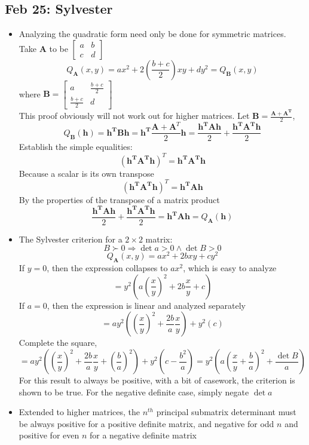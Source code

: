 \documentclass[10pt, oneside]{article}
\renewcommand{\vec}[1]{\mathbf{#1}}
\newcommand{\mat}[1]{\mathbf{#1}}
\begin{document}
\subsection{Feb 25: Sylvester}
\begin{itemize}
    \item Analyzing the quadratic form need only be done for symmetric matrices. Take $\mat{A}$ to be $\begin{bmatrix}
        a & b\\
        c & d
        \end{bmatrix}$
        \[Q_\mat{A} (x,y) = ax^2 + 2 \left( \frac{b+c}{2} \right) xy + dy^2 = Q_\mat{B}(x,y)\]
    where $\mat{B} = \begin{bmatrix}
        a & \frac{b+c}{2}\\
        \frac{b+c}{2} & d
    \end{bmatrix}$\\
    This proof obviously will not work out for higher matrices. Let $\mat{B} = \frac{\mat{A} + \mat{A^T}}{2}$,
        \[Q_\mat{B} (\vec{h}) = \vec{h^T} \mat{B} \vec{h} = \vec{h^T} \frac{\mat{A} + \mat{A}^T}{2} \vec{h} = \frac{\vec{h^T} \mat{A} \vec{h}}{2} + \frac{\vec{h^T} \mat{A^T} \vec{h}}{2}\]
    Establish the simple equalities:
        \[(\vec{h^T} \mat{A^T} \vec{h})^T = \vec{h^T} \mat{A^T} \vec{h}\]
        Because a scalar is its own transpose
        \[(\vec{h^T} \mat{A^T} \vec{h})^T = \vec{h^T} \mat{A} \vec{h}\]
        By the properties of the transpose of a matrix product
        \[\frac{\vec{h^T} \mat{A} \vec{h}}{2} + \frac{\vec{h^T} \mat{A^T} \vec{h}}{2} = \vec{h^T} \mat{A} \vec{h} = Q_\mat{A} (\vec{h})\]
    \item The Sylvester criterion for a $2\times 2$ matrix: \[B \succ 0 \Rightarrow \det a > 0 \land \det B > 0\]
        \[Q_\mat{A}(x,y) = ax^2 + 2bxy + cy^2\]
        If $y = 0$, then the expression collapses to $ax^2$, which is easy to analyze
        \[= y^2\left(a \left( \frac{x}{y} \right)^2 + 2b \frac{x}{y} + c \right)\]
        If $a = 0$, then the expression is linear and analyzed separately
        \[= a y^2\left( \left( \frac{x}{y} \right)^2 + \frac{2b}{a} \frac{x}{y} \right) + y^2(c)\]
        Complete the square,
        \[= a y^2\left( \left( \frac{x}{y} \right)^2 + \frac{2b}{a} \frac{x}{y} + \left(\frac{b}{a}\right)^2  \right) + y^2(c - \frac{b^2}{a}) = y^2 \left( a \left(\frac{x}{y} + \frac{b}{a}\right)^2 + \frac{\det B}{a} \right)\]
        For this result to always be positive, with a bit of casework, the criterion is shown to be true. For the negative definite case, simply negate $\det a$
    \item Extended to higher matrices, the $n^{th}$ principal submatrix determinant must be always positive for a positive definite matrix, and negative for odd $n$ and positive for even $n$ for a negative definite matrix
    \end{itemize}
    
\end{document}
